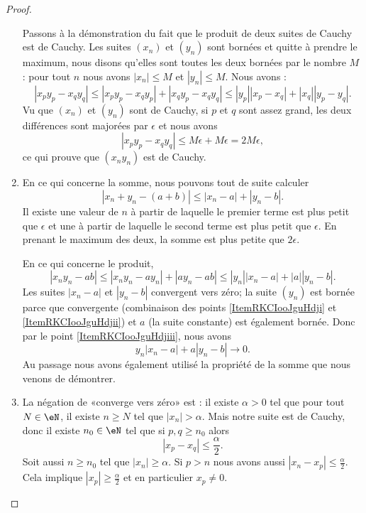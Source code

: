 \begin{proof}
\begin{enumerate}
            Passons à la démonstration du fait que le produit de deux suites de Cauchy est de Cauchy. Les suites \( (x_n)\) et \( (y_n)\) sont bornées et quitte à prendre le maximum, nous disons qu'elles sont toutes les deux bornées par le nombre \( M\) : pour tout \( n\) nous avons \( | x_n |\leq M\) et \( | y_n |\leq M\). Nous avons :
            \begin{equation}
                | x_py_p-x_qy_q |\leq | x_py_p-x_qy_p |+| x_qy_p-x_qy_q |\leq | y_p | |x_p-x_q |+| x_q | |y_p-y_q |.
            \end{equation}
            Vu que \( (x_n)\) et \( (y_n)\) sont de Cauchy, si \( p\) et \( q\) sont assez grand, les deux différences sont majorées par \( \epsilon\) et nous avons
            \begin{equation}
                | x_py_p-x_qy_q |\leq M\epsilon+M\epsilon=2M\epsilon,
            \end{equation}
            ce qui prouve que \( (x_ny_n)\) est de Cauchy.
        \item
            En ce qui concerne la somme, nous pouvons tout de suite calculer
            \begin{equation}        
                | x_n+y_n-(a+b) |\leq | x_n-a |+| y_n-b |.
            \end{equation}
            Il existe une valeur de \( n\) à partir de laquelle le premier terme est plus petit que \( \epsilon\) et une à partir de laquelle le second terme est plus petit que \( \epsilon\). En prenant le maximum des deux, la somme est plus petite que \( 2\epsilon\).

            En ce qui concerne le produit,
            \begin{equation}
                | x_ny_n-ab |\leq | x_ny_n-ay_n |+| ay_n-ab |\leq | y_n || x_n-a |+| a || y_n-b |.
            \end{equation}
            Les suites \( | x_n-a |\) et \( | y_n-b |\) convergent vers zéro; la suite \( (y_n)\) est bornée parce que convergente (combinaison des points \ref{ItemRKCIooJguHdji} et \ref{ItemRKCIooJguHdjii})  et \( a\) (la suite constante) est également bornée. Donc par le point \ref{ItemRKCIooJguHdjiii}, nous avons
            \begin{equation}
                y_n| x_n-a |+a| y_n-b |\to 0.
            \end{equation}
            Au passage nous avons également utilisé la propriété de la somme que nous venons de démontrer.
        \item 
            La négation de «converge vers zéro» est : il existe \( \alpha>0\) tel que pour tout \( N\in \eN\), il existe \( n\geq N\) tel que \( | x_n |>\alpha\). Mais notre suite est de Cauchy, donc il existe \( n_0\in \eN\) tel que si \( p,q\geq n_0\) alors 
            \begin{equation}
                | x_p-x_q |\leq \frac{ \alpha }{2}.
            \end{equation}
            Soit aussi \( n\geq n_0\) tel que \( | x_n |\geq \alpha\). Si \( p>n\) nous avons aussi \( | x_n-x_p |\leq \frac{ \alpha }{2}\). Cela implique \( | x_p |\geq \frac{ \alpha }{2}\) et en particulier \( x_p\neq 0\).


\end{enumerate}
\end{proof}
